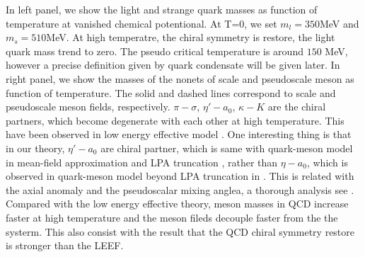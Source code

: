 \documentclass[%
reprint,
superscriptaddress,
showpacs,preprintnumbers,
amsmath,amssymb,
aps,
prd,
]{revtex4-1}
\def\fig#1{\Cref{#1}}
\begin{document}
In \fig{fig:MFMBO} left panel, we show the light and strange quark masses as function of temperature at vanished chemical potentional. At T=0, we set $m_l=350$MeV and $m_s=510$MeV. At high temperatre, the chiral symmetry is restore, the light quark mass trend to zero. The pseudo critical temperature is around $150$ MeV, however a precise definition given by quark condensate will be given later. In \fig{fig:MFMBO} right panel, we show the masses of the nonets of scale and pseudoscale meson as function of temperature. The solid and dashed lines correspond to scale and pseudoscale meson fields, respectively. $\pi-\sigma$, $\eta' - a_0$, $\kappa-K$ are the chiral partners, which become degenerate with each other at high temperature. This  have been observed in low energy effective model \cite{Schaefer:2008hk,Tiwari:2013pg,Rai:2018ufz,Mitter:2013fxa,Rennecke:2016tkm,Wen:2018nkn}. One interesting thing is that in our theory, $\eta' - a_0$ are chiral partner, which is same with quark-meson model in mean-field approximation \cite{Schaefer:2008hk,Tiwari:2013pg,Rai:2018ufz} and LPA truncation\cite{Mitter:2013fxa,Rennecke:2016tkm,Wen:2018nkn} , rather than $\eta - a_0$, which is observed in quark-meson model beyond LPA truncation in  \cite{Rennecke:2016tkm}. This is related with the axial anomaly and the pseudoscalar mixing anglea, a thorough analysis see  \cite{Rennecke:2016tkm}. Compared with the low energy effective theory, meson masses in QCD increase faster at high temperature and the meson fileds decouple faster from the the systerm. This also consist with the result that the QCD chiral symmetry restore is stronger than the LEEF.
\end{document}
